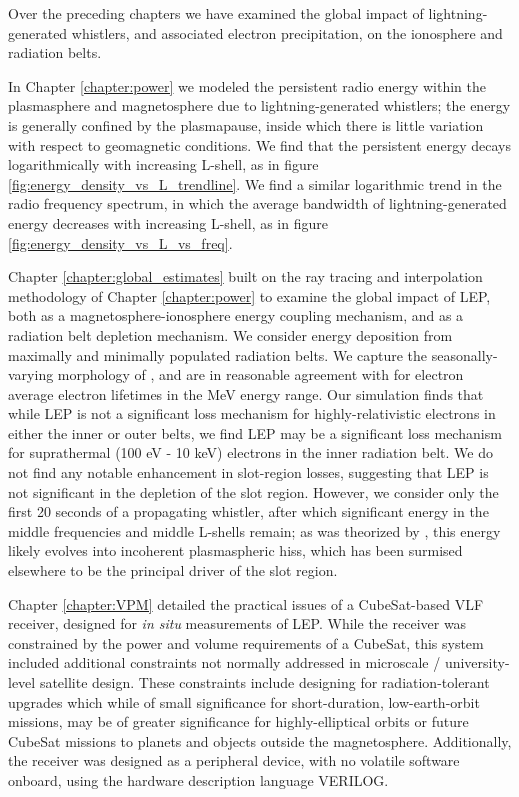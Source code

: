 Over the preceding chapters we have examined the global impact of lightning-generated whistlers, and associated electron precipitation, on the ionosphere and radiation belts. 

In Chapter \ref{chapter:power} we modeled the persistent radio energy within the plasmasphere and magnetosphere due to lightning-generated whistlers; the energy is generally confined by the plasmapause, inside which there is little variation with respect to geomagnetic conditions. We find that the persistent energy decays logarithmically with increasing L-shell, as in figure \ref{fig:energy_density_vs_L_trendline}. We find a similar logarithmic trend in the radio frequency spectrum, in which the average bandwidth of lightning-generated energy decreases with increasing L-shell, as in figure \ref{fig:energy_density_vs_L_vs_freq}.

Chapter \ref{chapter:global_estimates} built on the ray tracing and interpolation methodology of Chapter \ref{chapter:power} to examine the global impact of LEP, both as a magnetosphere-ionosphere energy coupling mechanism, and as a radiation belt depletion mechanism. We consider energy deposition from maximally and minimally populated radiation belts. We capture the seasonally-varying morphology of \cite{Gemelos2009}, and are in reasonable agreement with \cite{Meredith2007} for electron average electron lifetimes in the MeV energy range. Our simulation finds that while LEP is not a significant loss mechanism for highly-relativistic electrons in either the inner or outer belts, we find LEP may be a significant loss mechanism for suprathermal (100 eV - 10 keV) electrons in the inner radiation belt. We do not find any notable enhancement in slot-region losses, suggesting that LEP is not significant in the depletion of the slot region. However, we consider only the first 20 seconds of a propagating whistler, after which significant energy in the middle frequencies and middle L-shells remain; as was theorized by \cite{Bortnik2005}, this energy likely evolves into incoherent plasmaspheric hiss, which has been surmised elsewhere to be the principal driver of the slot region.

Chapter \ref{chapter:VPM} detailed the practical issues of a CubeSat-based VLF receiver, designed for \emph{in situ} measurements of LEP. While the receiver was constrained by the power and volume requirements of a CubeSat, this system included additional constraints not normally addressed in microscale / university-level satellite design. These constraints include designing for radiation-tolerant upgrades which while of small significance for short-duration, low-earth-orbit missions, may be of greater significance for highly-elliptical orbits or future CubeSat missions to planets and objects outside the magnetosphere. Additionally, the receiver was designed as a peripheral device, with no volatile software onboard, using the hardware description language VERILOG.

